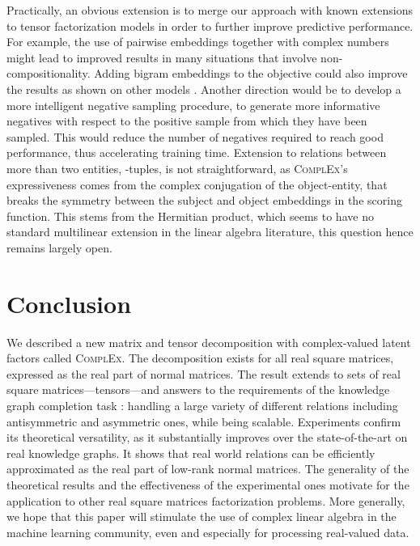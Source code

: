 \documentclass[twoside,11pt]{article}
\renewcommand{\cite}{\citep}
\begin{document}
Practically, an obvious extension is to merge our approach with known extensions to tensor factorization models in order to further improve predictive performance. For example, the use of pairwise embeddings \cite{riedel_2013_univschema,Welbl2016} together with complex numbers might lead to improved results in many situations that involve non-compositionality. Adding bigram embeddings to the objective
could also improve the results as shown on other models \cite{garcia2016combining}.
Another direction would be to develop a more intelligent negative sampling procedure, to generate more informative negatives with respect to the positive sample from which they have been sampled. This would reduce the number of negatives required to reach good performance, thus accelerating training time.
Extension to relations between more than two entities, -tuples,
is not straightforward, as \textsc{ComplEx}'s expressiveness comes from the complex conjugation
of the object-entity, that breaks the symmetry between the subject and object embeddings
in the scoring function. This stems from the Hermitian product, which seems to have no standard multilinear extension in the linear algebra literature, this question
hence remains largely open.



\section{Conclusion}



We described a new matrix and tensor decomposition with complex-valued latent factors called \textsc{ComplEx}.
The decomposition exists for all real square matrices, expressed
as the real part of normal matrices.
The result extends to sets of real square matrices---tensors---and answers to the 
requirements of the knowledge graph
completion task : handling a large variety of different relations including antisymmetric and
asymmetric ones, while being scalable.
Experiments confirm its theoretical versatility, as it substantially improves
over the state-of-the-art on real knowledge graphs.
It shows that real world relations can be efficiently approximated as
the real part of low-rank normal matrices.
The generality of the theoretical results and the effectiveness of the
experimental ones motivate for the application to other real square matrices
factorization problems. 
More generally, we hope that this paper will stimulate
the use of complex linear algebra in the machine learning community,
even and especially for processing real-valued data.
\end{document}
